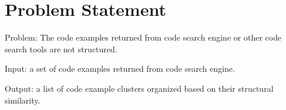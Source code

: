 \section{Problem Statement}

Problem: The code examples returned from code search engine or other code search tools are not structured. 



Input: a set of code examples returned from code search engine.

Output: a list of code example clusters organized based on their structural similarity. 








